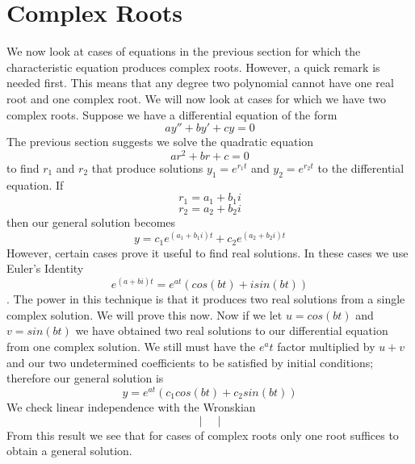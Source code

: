\section{Complex Roots}
We now look at cases of equations in the previous section for which the characteristic equation produces complex roots. However, a quick remark is needed first. 
This means that any degree two polynomial cannot have one real root and one complex root. We will now look at cases for which we have two complex roots. 
Suppose we have a differential equation of the form
\[ay'' + by' + cy = 0\]
The previous section suggests we solve the quadratic equation
\[ar^2 + br+ c = 0\] 
to find $r_1$ and $r_2$ that produce solutions $y_1 = e^{r_1t}$ and $y_2 = e^{r_2t}$ to the differential equation. If
\[r_1 = a_1 + b_1i\]
\[r_2 = a_2 + b_2i\]
then our general solution becomes
\[y = c_1e^{(a_1+b_1i)t} + c_2e^{(a_2+b_2i)t}\]
However, certain cases prove it useful to find real solutions. 
In these cases we use Euler's Identity 
\[e^{(a+bi)t} = e^{at}(cos(bt) + isin(bt))\].
The power in this technique is that it produces two real solutions from a single complex solution. We will prove this now.
Now if we let $u = cos(bt)$ and $v = sin(bt)$ we have obtained two real solutions to our differential equation from one complex solution. We still must have the $e^at$ factor multiplied by $u+v$ and our two undetermined coefficients to be satisfied by initial conditions; therefore our general solution is
\[y = e^{at}(c_1cos(bt) + c_2sin(bt))\]
We check linear independence with the Wronskian
\[\begin{vmatrix}
    
\end{vmatrix}\]
From this result we see that for cases of complex roots only one root suffices to obtain a general solution. 

